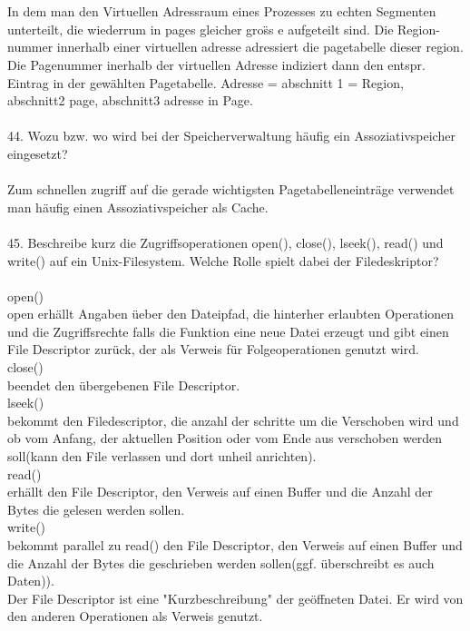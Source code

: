 \documentclass{article}
\newcommand\tab[1][1cm]{\hspace*{#1}}
\begin{document}
\\
\\
In dem man den Virtuellen Adressraum  eines Prozesses zu echten Segmenten unterteilt, die wiederrum in pages gleicher gro\"ss e aufgeteilt sind. Die Region-nummer innerhalb einer virtuellen adresse adressiert die pagetabelle dieser region. Die Pagenummer inerhalb der virtuellen Adresse indiziert dann den entspr. Eintrag in der gew\"ahlten Pagetabelle.
Adresse = abschnitt 1 = Region, abschnitt2 page, abschnitt3 adresse in Page.
\\
\\
44. Wozu bzw. wo wird bei der Speicherverwaltung häufig ein Assoziativspeicher eingesetzt?
\\
\\
Zum schnellen zugriff auf die gerade wichtigsten Pagetabelleneintr\"age verwendet man h\"aufig einen Assoziativspeicher als Cache. 
\\
\\
45. Beschreibe kurz die Zugriffsoperationen open(), close(), lseek(), read() und write()
auf ein Unix-Filesystem. Welche Rolle spielt dabei der Filedeskriptor?
\\
\\
open()\\
\tab open erh\"allt Angaben \"ueber den Dateipfad, die hinterher erlaubten Operationen und die Zugriffsrechte falls die Funktion eine neue Datei erzeugt und gibt einen File Descriptor zur\"uck, der als Verweis f\"ur Folgeoperationen genutzt wird.\\
close()\\
\tab beendet den \"ubergebenen File Descriptor.\\
lseek()\\
\tab bekommt den Filedescriptor, die anzahl der schritte um die Verschoben wird und ob vom Anfang, der aktuellen Position oder vom Ende aus verschoben werden soll(kann den File verlassen und dort unheil anrichten).\\
read()\\
\tab erh\"allt den File Descriptor, den Verweis auf einen Buffer und die Anzahl der Bytes die gelesen werden sollen.\\
write()\\
\tab bekommt parallel zu read() den File Descriptor, den Verweis auf einen Buffer und die Anzahl der Bytes die geschrieben werden sollen(ggf. \"uberschreibt es auch Daten)).\\
Der File Descriptor ist eine "Kurzbeschreibung" der ge\"offneten Datei. Er wird von den anderen Operationen als Verweis genutzt.
\end{document}
